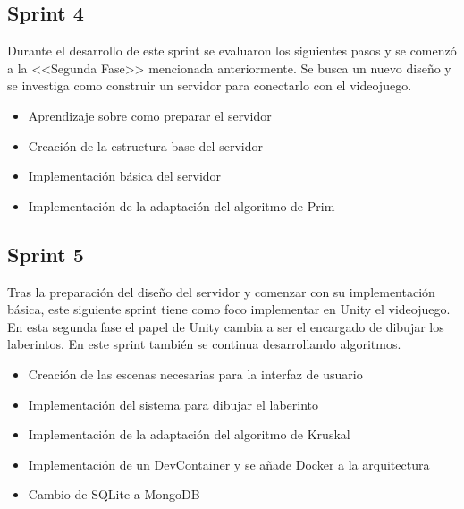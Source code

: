 \subsection{Sprint 4}
Durante el desarrollo de este sprint se evaluaron los siguientes pasos y se comenzó a la <<Segunda Fase>> mencionada anteriormente. Se busca un nuevo diseño y se investiga como construir un servidor para conectarlo con el videojuego.
\begin{itemize}
    \item Aprendizaje sobre como preparar el servidor
    \item Creación de la estructura base del servidor
    \item Implementación básica del servidor
    \item Implementación de la adaptación del algoritmo de Prim
\end{itemize}

\subsection{Sprint 5}
Tras la preparación del diseño del servidor y comenzar con su implementación básica, este siguiente sprint tiene como foco implementar en Unity el videojuego. En esta segunda fase el papel de Unity cambia a ser el encargado de dibujar los laberintos. En este sprint también se continua desarrollando algoritmos.
\begin{itemize}
    \item Creación de las escenas necesarias para la interfaz de usuario
    \item Implementación del sistema para dibujar el laberinto
    \item Implementación de la adaptación del algoritmo de Kruskal
    \item Implementación de un DevContainer y se añade Docker a la arquitectura 
    \item Cambio de SQLite a MongoDB
\end{itemize}

